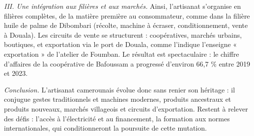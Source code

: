 \documentclass[11pt]{article}
\newcommand{\cle}[1]{{\popxbold\color{popdark}#1}}
\begin{document}
\begin{exoresolu}
\emph{III. Une intégration aux filières et aux marchés.} Ainsi, l'artisanat s'organise en \cle{filières} complètes, de la matière première au consommateur, comme dans la filière huile de palme de Dibombari (récolte, machine à écraser, conditionnement, vente à Douala). Les \cle{circuits de vente} se structurent : coopératives, marchés urbains, boutiques, et exportation via le port de Douala, comme l'indique l'enseigne « exportation » de l'atelier de Foumban. Le résultat est spectaculaire : le chiffre d'affaires de la coopérative de Bafoussam a progressé d'environ 66,7 \% entre 2019 et 2023.

\emph{Conclusion.} L'artisanat camerounais évolue donc sans renier son héritage : il conjugue gestes traditionnels et machines modernes, produits ancestraux et produits nouveaux, marchés villageois et circuits d'exportation. Restent à relever des défis : l'accès à l'électricité et au financement, la formation aux normes internationales, qui conditionneront la poursuite de cette mutation.
\end{exoresolu}
\end{document}
